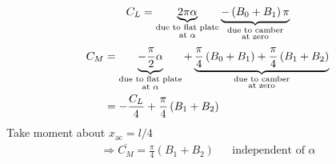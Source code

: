 \begin{equation}
C_L = \underbrace{2\pi\alpha}_{
\begin{subarray}{c}
  \text{due to flat plate}\\
  \text{at $\alpha$}
\end{subarray}
}  \underbrace{-\left(B_0+B_1\right)\pi}_{
\begin{subarray}{c}
  \text{due to camber}\\
  \text{at zero}
\end{subarray}
}
\label{eq: 6-2-77}
\end{equation}
\begin{align}
C_M 
&= \underbrace{-\frac{\pi}{2}\alpha}_{
\begin{subarray}{c}
  \text{due to flat plate}\\
  \text{at $\alpha$}
\end{subarray}
} + \underbrace{\frac{\pi}{4}\left(B_0+B_1\right)+\frac{\pi}{4}\left(B_1+B_2\right)}_{
\begin{subarray}{c}
  \text{due to camber}\\
  \text{at zero}
\end{subarray}
} \nonumber \\
&= -\frac{C_L}{4}+\frac{\pi}{4}\left(B_1+B_2\right)
\label{eq: 6-2-79}
\end{align}
Take moment about $x_\text{ac} = l/4$
\begin{align}
\Longrightarrow\overline{C_M} = \frac{\pi}{4}\left(B_1+B_2\right)&&\text{independent of }\alpha
\label{eq: 6-2-80}
\end{align}
